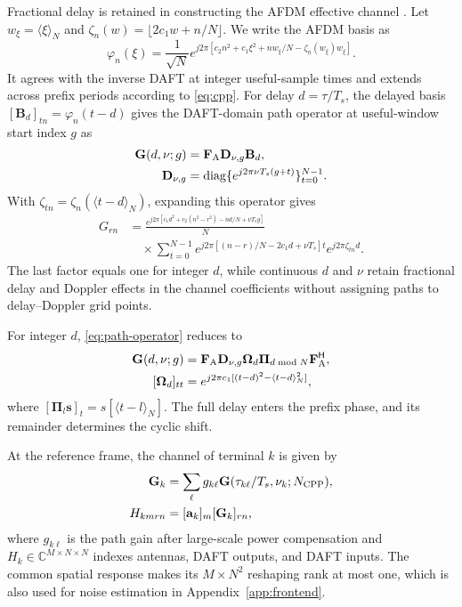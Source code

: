 Fractional delay is retained in constructing the AFDM effective channel
\cite{huang2026}. Let $w_\xi=\langle\xi\rangle_N$ and
$\zeta_n(w)=\lfloor2c_1w+n/N\rfloor$. We write the AFDM basis as
\begin{equation}
 \varphi_n(\xi)=\frac{1}{\sqrt N}
 e^{j2\pi[c_2n^2+c_1\xi^2+nw_\xi/N-\zeta_n(w_\xi)w_\xi]}.
 \label{eq:continuous-waveform}
\end{equation}
It agrees with the inverse DAFT at integer useful-sample times and
extends across prefix periods according to \eqref{eq:cpp}.
For delay $d=\tau/T_s$, the delayed basis
$[\mathbf B_d]_{tn}=\varphi_n(t-d)$ gives the DAFT-domain path
operator at useful-window start index $g$ as
\begin{equation}
 \begin{aligned}
 \mathbf G(d,\nu;g)&=\mathbf F_{\rm A}\mathbf D_{\nu,g}\mathbf B_d,\\
 \mathbf D_{\nu,g}&=\operatorname{diag}\{e^{j2\pi\nu T_s(g+t)}\}_{t=0}^{N-1}.
 \end{aligned}
 \label{eq:path-operator}
\end{equation}
With $\zeta_{tn}=\zeta_n(\langle t-d\rangle_N)$, expanding this
operator gives
\begin{equation}
 \begin{split}
 G_{rn}
 &=\frac{e^{j2\pi[c_1d^2+c_2(n^2-r^2)-nd/N+\nu T_sg]}}{N}\\
 &\quad\times\sum_{t=0}^{N-1}
 e^{j2\pi[(n-r)/N-2c_1d+\nu T_s]t}
 e^{j2\pi\zeta_{tn}d}.
 \end{split}
 \label{eq:path-entry-expansion}
\end{equation}
The last factor equals one for integer $d$, while continuous $d$ and
$\nu$ retain fractional delay and Doppler effects in the channel
coefficients without assigning paths to delay--Doppler grid points.

For integer $d$, \eqref{eq:path-operator} reduces to
\begin{align}
 \mathbf G(d,\nu;g)
 &=\mathbf F_{\rm A}\mathbf D_{\nu,g}\bm\Omega_d
   \bm\Pi_{d\bmod N}\mathbf F_{\rm A}^{\mathsf H},
 \label{eq:integer-operator}\\
 [\bm\Omega_d]_{tt}
 &=e^{j2\pi c_1[(t-d)^2-\langle t-d\rangle_N^2]},
 \label{eq:integer-prefix-phase}
\end{align}
where $[\bm\Pi_l\mathbf s]_t=s[\langle t-l\rangle_N]$.
The full delay enters the prefix phase, and its remainder determines
the cyclic shift.

At the reference frame, the channel of terminal $k$ is given by
\begin{equation}
 \begin{aligned}
 \mathbf G_k&=\sum_\ell g_{k\ell}
 \mathbf G(\tau_{k\ell}/T_s,\nu_k;N_{\rm CPP}),\\
 H_{kmrn}&=[\mathbf a_k]_m[\mathbf G_k]_{rn},
 \end{aligned}
 \label{eq:channel}
\end{equation}
where $g_{k\ell}$ is the path gain after large-scale power compensation
and $H_k\in\mathbb C^{M\times N\times N}$ indexes antennas, DAFT
outputs, and DAFT inputs. The common spatial response makes its
$M\times N^2$ reshaping rank at most one, which is also used for
noise estimation in Appendix~\ref{app:frontend}.

